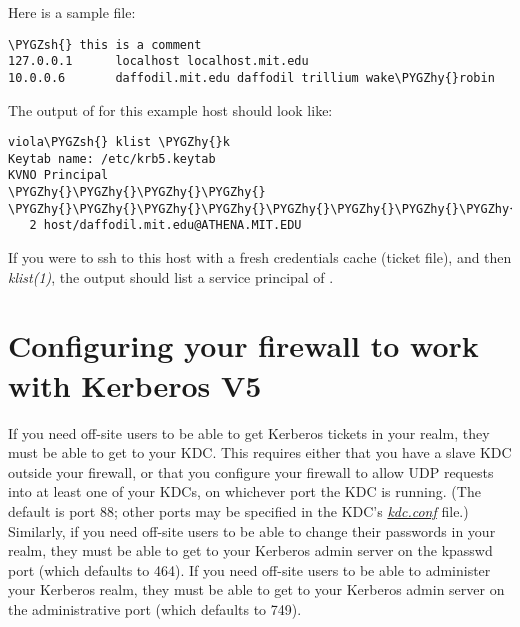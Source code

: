 \documentclass[letterpaper,10pt,english]{sphinxmanual}
\def\PYGZsh{\char`\#}
\def\PYGZhy{\char`\-}
\begin{document}
Here is a sample  file:

\begin{Verbatim}[commandchars=\\\{\}]
\PYGZsh{} this is a comment
127.0.0.1      localhost localhost.mit.edu
10.0.0.6       daffodil.mit.edu daffodil trillium wake\PYGZhy{}robin
\end{Verbatim}

The output of  for this example host should look like:

\begin{Verbatim}[commandchars=\\\{\}]
viola\PYGZsh{} klist \PYGZhy{}k
Keytab name: /etc/krb5.keytab
KVNO Principal
\PYGZhy{}\PYGZhy{}\PYGZhy{}\PYGZhy{} \PYGZhy{}\PYGZhy{}\PYGZhy{}\PYGZhy{}\PYGZhy{}\PYGZhy{}\PYGZhy{}\PYGZhy{}\PYGZhy{}\PYGZhy{}\PYGZhy{}\PYGZhy{}\PYGZhy{}\PYGZhy{}\PYGZhy{}\PYGZhy{}\PYGZhy{}\PYGZhy{}\PYGZhy{}\PYGZhy{}\PYGZhy{}\PYGZhy{}\PYGZhy{}\PYGZhy{}\PYGZhy{}\PYGZhy{}\PYGZhy{}\PYGZhy{}\PYGZhy{}\PYGZhy{}\PYGZhy{}\PYGZhy{}\PYGZhy{}\PYGZhy{}\PYGZhy{}\PYGZhy{}\PYGZhy{}\PYGZhy{}\PYGZhy{}\PYGZhy{}\PYGZhy{}\PYGZhy{}\PYGZhy{}\PYGZhy{}\PYGZhy{}\PYGZhy{}\PYGZhy{}\PYGZhy{}\PYGZhy{}\PYGZhy{}\PYGZhy{}\PYGZhy{}\PYGZhy{}\PYGZhy{}\PYGZhy{}\PYGZhy{}\PYGZhy{}\PYGZhy{}\PYGZhy{}\PYGZhy{}
   2 host/daffodil.mit.edu@ATHENA.MIT.EDU
\end{Verbatim}

If you were to ssh to this host with a fresh credentials cache (ticket
file), and then \emph{klist(1)}, the output should list a service
principal of .


\section{Configuring your firewall to work with Kerberos V5}
\label{admin/appl_servers:conf-firewall}\label{admin/appl_servers:configuring-your-firewall-to-work-with-kerberos-v5}
If you need off-site users to be able to get Kerberos tickets in your
realm, they must be able to get to your KDC.  This requires either
that you have a slave KDC outside your firewall, or that you configure
your firewall to allow UDP requests into at least one of your KDCs, on
whichever port the KDC is running.  (The default is port 88; other
ports may be specified in the KDC's {\hyperref[admin/conf_files/kdc_conf:kdc-conf-5]{\emph{kdc.conf}}} file.)
Similarly, if you need off-site users to be able to change their
passwords in your realm, they must be able to get to your Kerberos
admin server on the kpasswd port (which defaults to 464).  If you need
off-site users to be able to administer your Kerberos realm, they must
be able to get to your Kerberos admin server on the administrative
port (which defaults to 749).
\end{document}
